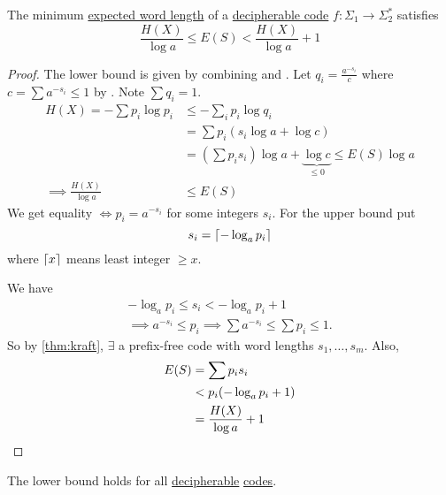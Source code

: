 \documentclass{article}
\DeclarePairedDelimiter{\ceil}{\lceil}{\rceil}
\newcommand{\1}[1]{\mathbbm{1}_{#1}}
\begin{document}
\begin{nthm}\label{thm:noiselessCode}
    The minimum \hyperlink{def:ewl}{expected word length} of a \hyperlink{def:decipherable}{decipherable code} $f: \Sigma_1 \to \Sigma_2^*$ satisfies
    \begin{equation*}
        \frac{H(X)}{\log a} \leq E(S) < \frac{H(X)}{\log a} + 1
    \end{equation*}
\end{nthm}
\begin{proof}
    The lower bound is given by combining  and .
    Let $q_i = \frac{a^{-s_i}}{c}$ where $c = \sum a^{-s_i} \leq 1$ by .
    Note $\sum q_i = 1$.
    \begin{align*}
        H(X) = -\sum p_i \log p_i &\leq -\sum_i p_i \log q_i \\
                                  &= \sum p_i (s_i \log a + \log c) \\
                                  &= \left(\sum p_i s_i\right) \log a + \underbrace{\log c}_{\leq 0} \leq E(S) \log a\\
        \implies \frac{H(X)}{\log a} &\leq E(S)
    \end{align*}
    We get equality $\iff p_i = a^{-s_i}$ for some integers $s_i$.
    For the upper bound put
    \begin{equation*}
        s_i = \ceil{-\log_a p_i}
    \end{equation*}
    where $\ceil{x}$ means least integer $\geq x$.

    We have
    \begin{gather*}
        - \log_a p_i \leq s_i < - \log_a p_i + 1 \\
        \implies a^{-s_i} \leq p_i \implies \sum a^{-s_i} \leq \sum p_i \leq 1.
    \end{gather*}
    So by \cref{thm:kraft}, $\exists$ a prefix-free code with word lengths $s_1, \dotsc, s_m$.
    Also,
    \begin{align*}
        E(S) &= \sum p_i s_i \\
             &< p_i (- \log_a p_i + 1) \\
             &= \frac{H(X)}{\log a} + 1 \qedhere
    \end{align*}
\end{proof}
\begin{remark}
    The lower bound holds for all \hyperlink{def:decipherable}{decipherable} \hyperlink{def:code}{codes}.
\end{remark}
\end{document}
